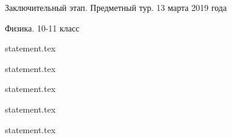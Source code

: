 \documentclass[a4paper,11pt, oneside]{book}
\begin{document}
\vspace{-3mm}
\vspace{-5mm}

\normalsize

\begin{center}
    Заключительный этап. Предметный тур. 13 марта 2019 года
    
    Физика. 10-11 класс
\end{center}

\parindent=0cm

{statement.tex}

{statement.tex}

{statement.tex}

{statement.tex}

\newpage

{statement.tex}
\end{document}
